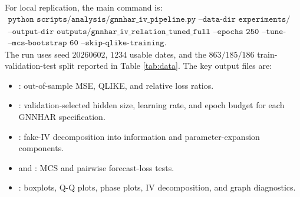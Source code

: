 \documentclass[11pt,a4paper]{article}
\begin{document}
For local replication, the main command is:
\[
\begin{gathered}
\texttt{python scripts/analysis/gnnhar\_iv\_pipeline.py
--data-dir experiments/dow30/data}\\
\texttt{--output-dir outputs/gnnhar\_iv\_relation\_tuned\_full
--epochs 250 --tune-gnn}\\
\texttt{--mcs-bootstrap 60 --skip-qlike-training}.
\end{gathered}
\]
The run uses seed \(20260602\), \(1234\) usable dates, and the \(863/185/186\)
train-validation-test split reported in Table \ref{tab:data}. The key output files are:

\begin{itemize}
\setlength{\itemsep}{0pt}
\item {}: out-of-sample MSE, QLIKE, and relative loss ratios.
\item {}: validation-selected hidden size, learning rate, and epoch
budget for each GNNHAR specification.
\item {}: fake-IV decomposition into information and
parameter-expansion components.
\item {} and : MCS and pairwise
forecast-loss tests.
\item {}: boxplots, Q-Q plots, phase plots, IV decomposition, and graph diagnostics.
\end{itemize}
\end{document}
